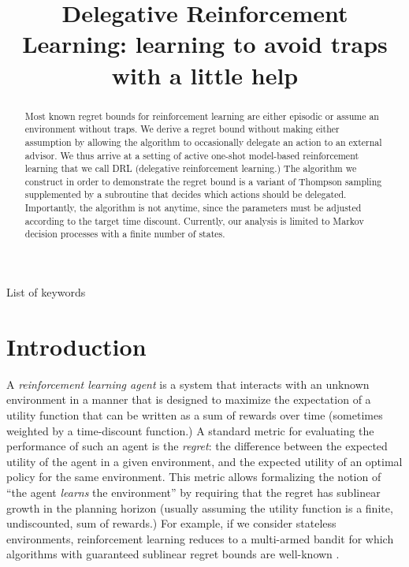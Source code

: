 \documentclass[anon,12pt]{colt2018} %
\title[Delegative Reinforcement Learning]{Delegative Reinforcement Learning: learning to avoid traps\\ with a little help}
\newcommand{\Comment}[1]{}
\begin{document}
\maketitle

\begin{abstract}
Most known regret bounds for reinforcement learning are either episodic or assume an environment without traps. We derive a regret bound without making either assumption by allowing the algorithm to occasionally delegate an action to an external advisor. We thus arrive at a setting of active one-shot model-based reinforcement learning that we call DRL (delegative reinforcement learning.) The algorithm we construct in order to demonstrate the regret bound is a variant of Thompson sampling supplemented by a subroutine that decides which actions should be delegated. Importantly, the algorithm is not anytime, since the parameters must be adjusted according to the target time discount. \Comment{We also demonstrate that this setting can handle situations in which the reward signal and the advisor become unreliable in particular environment states (assuming these states can be avoided.) }Currently, our analysis is limited to Markov decision processes with a finite number of states.
\end{abstract}

\begin{keywords}
List of keywords
\end{keywords}

\section{Introduction}

A \emph{reinforcement learning agent} is a system that interacts with an unknown environment in a manner that is designed to maximize the expectation of a utility function that can be written as a sum of rewards over time (sometimes weighted by a time-discount function.) A standard metric for evaluating the performance of such an agent is the \emph{regret}: the difference between the expected utility of the agent in a given environment, and the expected utility of an optimal policy for the same environment. This metric allows formalizing the notion of \enquote{the agent \emph{learns} the environment} by requiring that the regret has sublinear growth in the planning horizon (usually assuming the utility function is a finite, undiscounted, sum of rewards.) For example, if we consider stateless environments, reinforcement learning reduces to a multi-armed bandit for which algorithms with guaranteed sublinear regret bounds are well-known \cite{TBD}.
\end{document}
